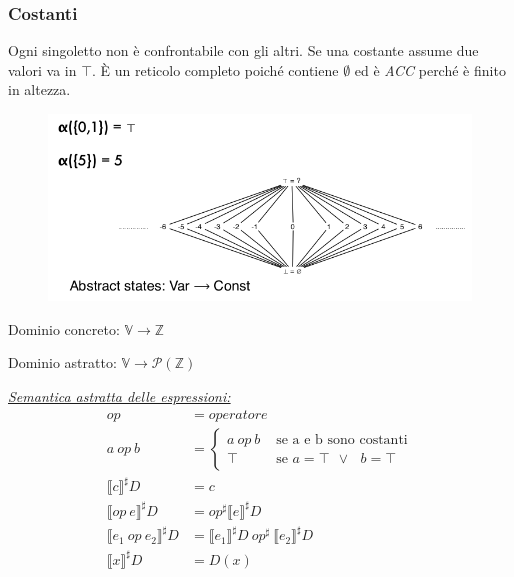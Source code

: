 \documentclass{article}
\begin{document}
            \subsubsection{Costanti}
                Ogni singoletto non è confrontabile con gli altri. Se una costante assume due valori va in $\top$. \MakeUppercase{è} un reticolo completo poiché contiene $\emptyset$ ed è \textit{ACC} perché è finito in altezza.
                \begin{figure}[H]
                    \centering
                    \includegraphics[scale=0.32]{Const}
                \end{figure}

                Dominio concreto: $\mathbb{V}\rightarrow \mathbb{Z}$

                Dominio astratto: $\mathbb{V}\rightarrow \mathcal{P}(\mathbb{Z})$
                \newline

                \noindent
                \underline{\textit{Semantica astratta delle espressioni:}}
                \begin{align*}
                    op &= operatore\\
                    a ~op~ b &=
                    \begin{cases}
                        a ~op~ b &\text{ se a e b sono costanti}\\
                        \top &\text{ se $a=\top$ $\lor~$ $b=\top$}
                    \end{cases}\\
                    \llbracket c \rrbracket^\sharp D &= c\\
                    \llbracket op~e \rrbracket^\sharp D &= op^\sharp\llbracket e\rrbracket^\sharp D\\
                    \llbracket e_1~op~e_2 \rrbracket^\sharp D &= \llbracket e_1\rrbracket^\sharp D ~op^\sharp~\llbracket e_2\rrbracket^\sharp D\\
                    \llbracket x\rrbracket^\sharp D &= D(x)
                \end{align*}
\end{document}
